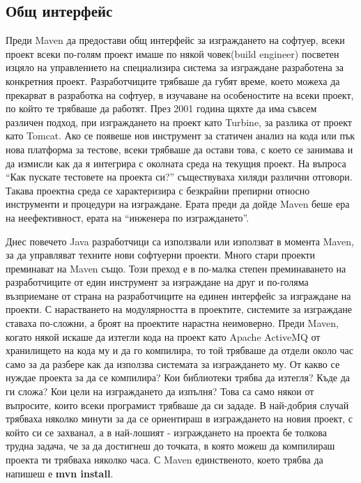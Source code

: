 \subsection{Общ интерфейс}
Преди Maven да предостави общ интерфейс за изграждането на софтуер,
всеки проект всеки по-голям проект имаше по някой човек(build
engineer) посветен изцяло на управлението на специализира система за
изграждане разработена за конкретния проект. Разработчиците трябваше
да губят време, което можеха да прекарват в разработка на софтуер, в
изучаване на особеностите на всеки проект, по който те трябваше да
работят. През 2001 година щяхте да има съвсем различен подход, при
изграждането на проект като Turbine, за разлика от проект като
Tomcat. Ако се появеше нов инструмент за статичен анализ на кода или
пък нова платформа за тестове, всеки трябваше да остави това, с което
се занимава и да измисли как да я интегрира с околната среда на
текущия проект. На въпроса "`Как пускате тестовете на проекта си?"'
съществуваха хиляди различни отговори. Такава проектна среда се
характеризира с безкрайни препирни относно инструменти и процедури на
изграждане. Ерата преди да дойде Maven беше ера на неефективност,
ерата на "`инженера по изграждането"'.

Днес повечето Java разработчици са използвали или използват в момента
Maven, за да управляват техните нови софтуерни проекти. Много стари
проекти преминават на Maven също. Този преход е в по-малка степен
преминаването на разработчиците от един инструмент за изграждане на
друг и по-голяма възприемане от страна на разработчиците на единен
интерфейс за изграждане на проекти. С нарастването на модулярността в
проектите, системите за изграждане ставаха по-сложни, а броят на
проектите нарастна неимоверно. Преди Maven, когато някой искаше да
изтегли кода на проект като Apache ActiveMQ от хранилището на кода му
и да го компилира, то той трябваше да отдели около час само за да
разбере как да използва системата за изграждането му. От какво се
нуждае проекта за да се компилира? Кои библиотеки трябва да изтегля?
Къде да ги сложа? Кои цели на изграждането да изпълня? Това са само
някои от въпросите, които всеки програмист трябваше да си зададе. В
най-добрия случай трябваха няколко минути за да се ориентираш в
изграждането на новия проект, с който си се захванал, а в най-лошият -
изграждането на проекта бе толкова трудна задача, че за да достигнеш
до точката, в която можеш да компилираш проекта ти трябваха няколко
часа. С Maven единственото, което трябва да напишеш е \textbf{mvn
  install}.


